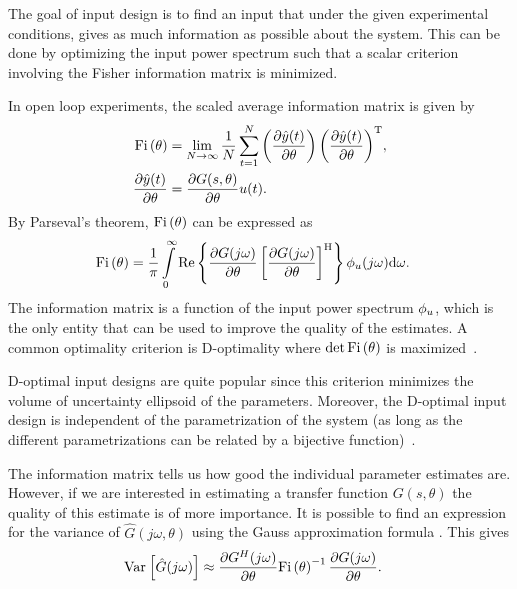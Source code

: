 The goal of input design is to find an input that under the given experimental conditions, gives as much information as possible about the system.
This can be done by optimizing the input power spectrum such that  a scalar criterion involving the Fisher information matrix is minimized.

In open loop experiments, the scaled average information matrix is given by
\begin{align}
\mathrm{Fi} \left(\theta\right) & = \lim_{N\rightarrow\infty}
          \frac{1}{N}
            \sum_{t=1}^{N}
              {\left(\frac{\partial\hat{y}(t)}{\partial\theta}\right)
               \left(\frac{\partial\hat{y}(t)}{\partial\theta}\right)^{\mathrm{T}}},\\
\frac{\partial\hat{y}(t)}{\partial\theta}
    & =\frac{\partial G(s,\theta)}{\partial \theta}u(t).
\end{align}
By Parseval's theorem, $\mathrm{Fi} \left(\theta\right)$ can be expressed as
\begin{align}
\mathrm{Fi} \left(\theta\right) &= \frac{1}{\pi}
         \int\limits_0^\infty \operatorname{\mathrm{Re}}
           \left\{      \frac{\partial G(j\omega)}{\partial \theta}
                  \left[\frac{\partial G(j\omega)}{\partial \theta}\right]^{\mathrm{H}}
           \right\}
           \phi_{u}(j\omega)
           \mathrm{d}{\omega} \text{.}
\label{eq:excitation:IF}
\end{align}
The information matrix is a function of the input power spectrum $\phi_{u}$, which is the only entity that can be used to improve the quality of the estimates. 
A common optimality criterion is D-optimality where $\det{\ensuremath{\mathrm{Fi} \left(\theta\right)}}$ is maximized~\citep{Goodwin1977}.

\begin{remark}
D-optimal input designs are quite popular since this criterion minimizes the volume of uncertainty ellipsoid of the parameters.
Moreover, the D-optimal input design is independent of the parametrization of the system (as long as the different parametrizations can be related by a bijective function)~\citep[Chapter 6]{Goodwin1977}.
\end{remark}

The information matrix tells us how good the individual parameter estimates are. However, if we are interested in estimating a transfer function $G(s,\theta)$ the quality of this estimate is of more importance. 
It is possible to find an expression for the variance of $\hat{G}(j\omega,\theta)$ using the Gauss approximation formula \citep{Ljung1999, Pintelon2012}. This gives
\begin{align}
\operatorname{\mathrm{Var}}_{} \left[ \hat{G}(j\omega) \right] &\approx \frac{\partial G^H(j\omega)}{\partial \theta}\mathrm{Fi} \left(\theta\right)^{-1}\frac{\partial G(j\omega)}{\partial \theta}.
\label{eq:excitation:varG}
\end{align}

